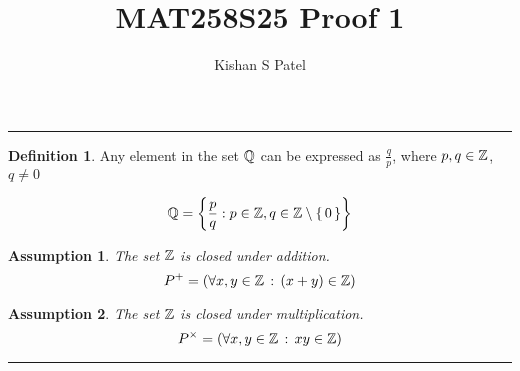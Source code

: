 \documentclass{exam}
\theoremstyle{plain}
\newtheorem{assumption}{Assumption}
\theoremstyle{definition}
\newtheorem{definition}{Definition}
\begin{document}
\title{MAT258S25 Proof 1}
\author{Kishan S Patel}
\maketitle

\renewcommand{\qedsymbol}{QED}

\noindent\rule{\textwidth}{1pt}

\begin{definition}
	Any element in the set ${\mathbb Q}$ can be expressed as $\frac{q}{p}$,
	where $p,q \in {\mathbb Z}$, $q \neq 0$

	$$ {\mathbb Q} = \left\{ \frac{p}{q} : p \in {\mathbb Z}, q \in {\mathbb Z} \setminus \set{0} \right\} $$
\end{definition}


\begin{assumption}
	The set ${\mathbb Z}$ is closed under addition.
	$$P^{+}= { \left( \forall x, y \in {\mathbb Z} \,:\, { (x+y) \in {\mathbb Z} }\right) }$$
\end{assumption}

\begin{assumption}
	The set ${\mathbb Z}$ is closed under multiplication.
	$$P^{\times} = { \left(\forall x, y \in {\mathbb Z} \,:\, { xy \in {\mathbb Z} }\right) }$$
\end{assumption}

\noindent\rule{\textwidth}{1pt}

\begin{questions}
	
	
\end{questions}
\end{document}
